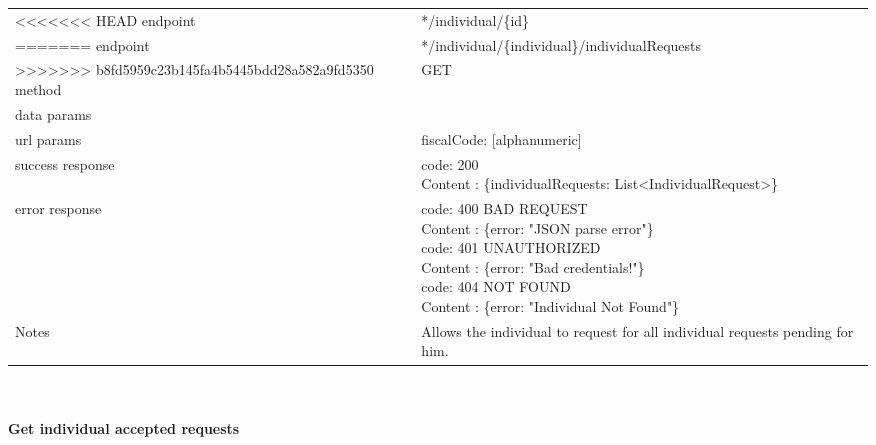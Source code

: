 \begin{legal}
\begin{legal}
\begin{itemize}
								\begin{tabularx}{\linewidth}{| l| l }
									\hline
<<<<<<< HEAD
									endpoint & */individual/\{id\}\\
=======
									endpoint & */individual/\{individual\}/individualRequests \\
>>>>>>> b8fd5959c23b145fa4b5445bdd28a582a9fd5350
									\hline
									method & GET \\
									\hline
									data params & \\
									\hline
									url params &
									\parbox{0.7\textwidth}{
										\bigskip
										fiscalCode: [alphanumeric]
										\bigskip
									} \\
									\hline
									success response &
									\parbox{0.7\textwidth}{
										\bigskip
										code: 200\\
										Content : \{individualRequests: List<IndividualRequest>\}
										\bigskip
									} \\
									\hline
									error response &
									\parbox{0.7\textwidth}{
										\bigskip
										code: 400 BAD REQUEST \\
										Content : \{error: "JSON parse error"\}\\
										code: 401 UNAUTHORIZED \\
										Content : \{error: "Bad credentials!"\}\\
										code: 404 NOT FOUND \\
										Content : \{error: "Individual Not Found"\}
										\bigskip
									} \\
									\hline
									Notes & 
									\parbox{0.7\textwidth}{
										\bigskip Allows the individual to request for all individual requests pending for him.
									\bigskip}  \\
									\hline
								\end{tabularx}\\\\
								
								\textbf{Get individual accepted requests} \\
			

\end{itemize}
\end{legal}
\end{legal}
